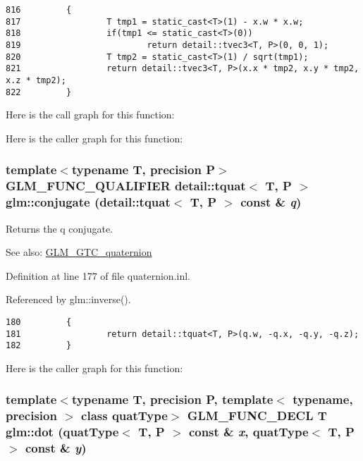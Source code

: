 \begin{Code}\begin{verbatim}816         {
817                 T tmp1 = static_cast<T>(1) - x.w * x.w;
818                 if(tmp1 <= static_cast<T>(0))
819                         return detail::tvec3<T, P>(0, 0, 1);
820                 T tmp2 = static_cast<T>(1) / sqrt(tmp1);
821                 return detail::tvec3<T, P>(x.x * tmp2, x.y * tmp2, x.z * tmp2);
822         }
\end{verbatim}
\end{Code}




Here is the call graph for this function:

Here is the caller graph for this function:\hypertarget{group__gtc__quaternion_gdbb01a11c8e4f4e0602f6cc649896066}{
\subsubsection[conjugate]{\setlength{\rightskip}{0pt plus 5cm}template$<$typename T, precision P$>$ GLM\_\-FUNC\_\-QUALIFIER detail::tquat$<$ T, P $>$ glm::conjugate (detail::tquat$<$ T, P $>$ const \& {\em q})}}
\label{group__gtc__quaternion_gdbb01a11c8e4f4e0602f6cc649896066}


Returns the q conjugate.

\begin{Desc}
\item[See also:]\hyperlink{group__gtc__quaternion}{GLM\_\-GTC\_\-quaternion} \end{Desc}


Definition at line 177 of file quaternion.inl.

Referenced by glm::inverse().

\begin{Code}\begin{verbatim}180         {
181                 return detail::tquat<T, P>(q.w, -q.x, -q.y, -q.z);
182         }
\end{verbatim}
\end{Code}




Here is the caller graph for this function:\hypertarget{group__gtc__quaternion_g4ce8bce2b7dc8206a31cfb8e7b779b76}{
\subsubsection[dot]{\setlength{\rightskip}{0pt plus 5cm}template$<$typename T, precision P, template$<$ typename, precision $>$ class quatType$>$ GLM\_\-FUNC\_\-DECL T glm::dot (quatType$<$ T, P $>$ const \& {\em x}, \/  quatType$<$ T, P $>$ const \& {\em y})}}
\label{group__gtc__quaternion_g4ce8bce2b7dc8206a31cfb8e7b779b76}


